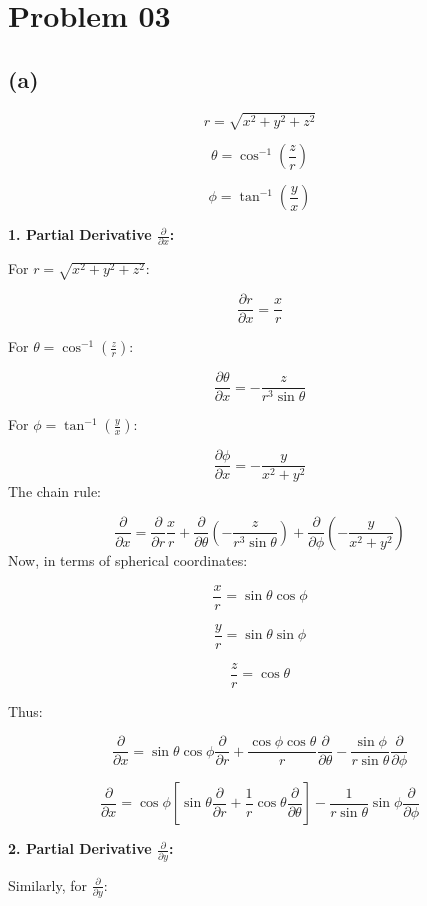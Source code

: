 \documentclass[letter, 10pts]{article}
\begin{document}
\newpage
\section*{Problem 03} 
\subsection*{(a)}
\[
r = \sqrt{x^2 + y^2 + z^2}
\]

\[
\theta = \cos^{-1}\left( \frac{z}{r} \right)
\]

\[
\phi = \tan^{-1} \left( \frac{y}{x} \right)
\]

\textbf{1. Partial Derivative \( \frac{\partial}{\partial x} \):}


For \(r = \sqrt{x^2 + y^2 + z^2}\):

\[
\frac{\partial r}{\partial x} = \frac{x}{r}
\]

For \(\theta = \cos^{-1} \left( \frac{z}{r} \right)\):

\[
\frac{\partial \theta}{\partial x} = -\frac{z}{r^3 \sin\theta}
\]

For \(\phi = \tan^{-1} \left( \frac{y}{x} \right)\):

\[
\frac{\partial \phi}{\partial x} = -\frac{y}{x^2 + y^2}
\]
The chain rule:


\[
\frac{\partial}{\partial x} = \frac{\partial}{\partial r} \frac{x}{r} + \frac{\partial}{\partial \theta} \left( -\frac{z}{r^3 \sin\theta} \right) + \frac{\partial}{\partial \phi} \left( -\frac{y}{x^2 + y^2} \right)
\]
Now, in terms of spherical coordinates:

\[
\frac{x}{r} = \sin\theta \cos\phi
\]

\[
\frac{y}{r} = \sin\theta \sin\phi
\]

\[
\frac{z}{r} = \cos\theta
\]

Thus:

\[
\frac{\partial}{\partial x} = \sin\theta \cos\phi \frac{\partial}{\partial r} + \frac{\cos \phi \cos\theta}{r} \frac{\partial}{\partial \theta} - \frac{\sin\phi}{r \sin\theta} \frac{\partial}{\partial \phi}
\]


\[\boxed{
\frac{\partial}{\partial x} = \cos \phi 
\left[
\sin\theta \frac{\partial}{\partial r} + \frac{1}{r}\cos \theta \frac{\partial}{\partial \theta} \right] 
- \frac{1}{r \sin\theta}\sin \phi \frac{\partial}{\partial \phi}
}\]


\textbf{2. Partial Derivative \( \frac{\partial}{\partial y} \):}

Similarly, for \( \frac{\partial}{\partial y} \):
\end{document}
